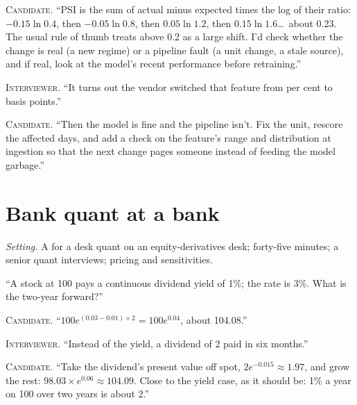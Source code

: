 \noindent\textsc{Candidate.} ``PSI is the sum of actual minus expected times the log of their ratio: $-0.15 \ln 0.4$, then $-0.05
\ln 0.8$, then $0.05 \ln 1.2$, then $0.15 \ln 1.6$\ldots\ about 0.23. The usual rule of thumb treats above 0.2 as a large shift. I'd
check whether the change is real (a new regime) or a pipeline fault (a unit change, a stale source), and if real, look at the
model's recent performance before retraining.''


\noindent\textsc{Interviewer.} ``It turns out the vendor switched that feature from per cent to basis points.''

\noindent\textsc{Candidate.} ``Then the model is fine and the pipeline isn't. Fix the unit, rescore the affected days, and add a check on
the feature's range and distribution at ingestion so that the next change pages someone instead of feeding the model garbage.''


\section{Bank quant at a bank}

\emph{Setting.} A  for a desk quant on an equity-derivatives desk; forty-five minutes; a senior quant interviews;
pricing and sensitivities.

\begin{interviewq}\label{iq:iv:mock-interviews:13}
``A stock at 100 pays a continuous dividend yield of 1\%; the rate is 3\%. What is the two-year forward?''
\end{interviewq}

\noindent\textsc{Candidate.} ``$100 e^{(0.03 - 0.01) \times 2} = 100 e^{0.04}$, about 104.08.''


\noindent\textsc{Interviewer.} ``Instead of the yield, a dividend of 2 paid in six months.''

\noindent\textsc{Candidate.} ``Take the dividend's present value off spot, $2e^{-0.015} \approx 1.97$, and grow the rest: $98.03 \times
e^{0.06} \approx 104.09$. Close to the yield case, as it should be: 1\% a year on 100 over two years is about 2.''

